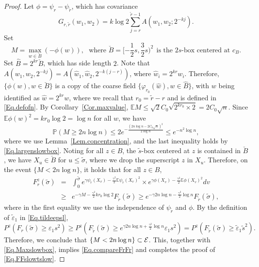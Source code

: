 \documentclass[11pt]{article}
\theoremstyle{definition}
\def \e {\varepsilon}
\def \E {{\mathbb{E}}}
\def \P {{\mathbb{P}}}
\def \s {\sigma}
\def \ee {{\cal E}}
\begin{document}
\begin{proof}
Let $\phi = \psi_r  - \psi_{\tilde r}$, which has covariance
 $$
G_{r,\tilde r} (w_1, w_2) = k \log 2 \sum_{j=r}^{\tilde r - 1} A (w_1, w_2; 2^{-kj}) .
 $$
Set
 $$
M = \max_{w \in \breve{B} } ( -\phi (w)) ,
\ \ \ \mbox{where } \breve{B} = [- \frac 1 2 s, \frac 3 2 s )^2 \ \ \mbox{is the $2 s$-box centered at $c_B$.}
 $$
Set $\hat B = 2^{kr} \breve{B}$, which has side length $2$. Note that
$A(w_1, w_2, 2^{-kj}) = A(\hat w_1, \hat w_2, 2^{- k (j-r)})$, where $\hat w_i = 2^{k r} w_i$. Therefore, $\{ \phi (w), w \in \breve{B} \}$ is a copy of the coarse field $\{ \varphi_{r_0} (\hat w), w \in \hat B \}$, with $w$ being identified as $\hat w = 2^{k r} w$, where we recall that $r_0 = \tilde r - r$ and is defined in \eqref{Eq.defofn}. By Corollary~\ref{Cor.maxvalue}, $\E M \le \sqrt 2 C_0 \sqrt {2^{k r_0} \times 2} = 2 C_0 \sqrt {n}$. Since $\E \phi (w)^2 =  k r_0 \log 2 = \log n$ for all $w$, we have
 \begin{equation} \label{Eq.Maxslowbox}
\P ( M \ge 2 n \log n) \le 2 e^{- \frac {(2 n \log n -2  C_0 \sqrt {n} )^2} {2 \log n}} \le  e^{- n^2 \log n }   ,
 \end{equation}
where we use Lemma~\ref{Lem.concentration}, and the last inequality holds by \eqref{Eq.largenslowbox}. Noting for all $z \in B$, the $\tilde s$-box centered at $z$ is contained in $\breve{B}$, we have $X_u \in \breve B$ for $u \le \tilde \s$, where we drop the superscript $z$ in $X_u$. Therefore, on the event $\{ M < 2 n \log n \}$, it holds that
for all $z\in B$,
 \begin{eqnarray*}
F^z_r (\tilde \s)
 & = &
\int_0^{\tilde \s} e^{\gamma \psi_{\tilde r} (X_v) - \frac {\gamma^2} 2 \E \psi_{\tilde r} (X_v)^2 } \times e^{\gamma \phi (X_v) - \frac {\gamma^2} 2 \E \phi (X_v)^2 } d v
 \\ & \ge &
e^{- \gamma M - \frac {\gamma^2} 2 k r_0 \log 2 } F_{\tilde r} (\tilde \s ) \ge e^{- \gamma 2 n \log n - \frac {\gamma^2} 2 \log n } F_{\tilde r} (\tilde \s ) ,
 \end{eqnarray*}
where in the first equality we use the independence of $\psi_{\tilde r}$ and $\phi$. By the definition of $\tilde \e_1$ in \eqref{Eq.tildeepsl},
 $$
P^z (F_r (\tilde \s) \ge \e_1 s^2) \ge P^z (F_{\tilde r} (\tilde \s)  \ge e^{\gamma 2 n \log n + \frac {\gamma^2} 2 \log n } \e_1 s^2 )  = P^z (F_{\tilde r} (\tilde \s)  \ge  \tilde \e_1 \tilde s^2 ).
 $$
Therefore, we conclude that $\{M<2n\log n\}\subset \ee$. This, together with
\eqref{Eq.Maxslowbox}, implies \eqref{Eq.compareFrFr} and completes the proof of
 \eqref{Eq.FFslowtslow}.


\end{proof}
\end{document}
